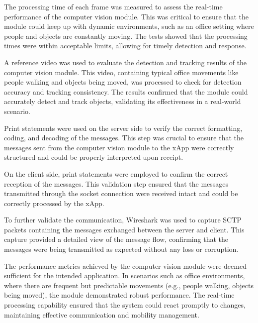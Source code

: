 The processing time of each frame was measured to assess the real-time performance of the computer vision module. This was critical to ensure that the module could keep up with dynamic environments, such as an office setting where people and objects are constantly moving. The tests showed that the processing times were within acceptable limits, allowing for timely detection and response.

A reference video was used to evaluate the detection and tracking results of the computer vision module. This video, containing typical office movements like people walking and objects being moved, was processed to check for detection accuracy and tracking consistency. The results confirmed that the module could accurately detect and track objects, validating its effectiveness in a real-world scenario.


Print statements were used on the server side to verify the correct formatting, coding, and decoding of the messages. This step was crucial to ensure that the messages sent from the computer vision module to the xApp were correctly structured and could be properly interpreted upon receipt.

On the client side, print statements were employed to confirm the correct reception of the messages. This validation step ensured that the messages transmitted through the socket connection were received intact and could be  correctly processed by the xApp.

To further validate the communication, Wireshark was used to capture SCTP packets containing the messages exchanged between the server and client. This capture provided a detailed view of the message flow, confirming that the messages were being transmitted as expected without any loss or corruption.





The performance metrics achieved by the computer vision module were deemed sufficient for the intended application. In scenarios such as office environments, where there are frequent but predictable movements (e.g., people walking, objects being moved), the module demonstrated robust performance. The real-time processing capability ensured that the system could react promptly to changes, maintaining effective communication and mobility management.




